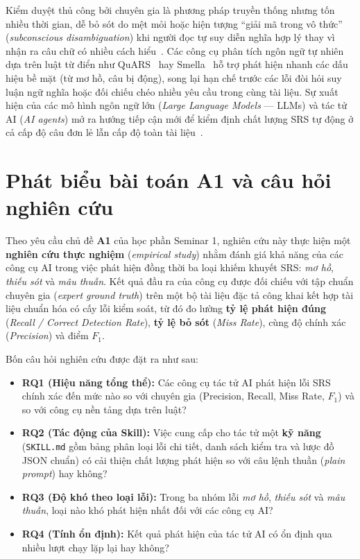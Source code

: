 \documentclass[12pt,a4paper]{report}
\begin{document}
Kiểm duyệt thủ công bởi chuyên gia là phương pháp truyền thống nhưng tốn nhiều thời gian, dễ bỏ sót do mệt mỏi hoặc hiện tượng ``giải mã trong vô thức'' (\textit{subconscious disambiguation}) khi người đọc tự suy diễn nghĩa hợp lý thay vì nhận ra câu chữ có nhiều cách hiểu~\cite{berry2003}. Các công cụ phân tích ngôn ngữ tự nhiên dựa trên luật từ điển như QuARS~\cite{fabbrini2005} hay Smella~\cite{femmer2017} hỗ trợ phát hiện nhanh các dấu hiệu bề mặt (từ mơ hồ, câu bị động), song lại hạn chế trước các lỗi đòi hỏi suy luận ngữ nghĩa hoặc đối chiếu chéo nhiều yêu cầu trong cùng tài liệu. Sự xuất hiện của các mô hình ngôn ngữ lớn (\textit{Large Language Models} --- LLMs) và tác tử AI (\textit{AI agents}) mở ra hướng tiếp cận mới để kiểm định chất lượng SRS tự động ở cả cấp độ câu đơn lẻ lẫn cấp độ toàn tài liệu~\cite{lubos2024,ronanki2025}.

\section{Phát biểu bài toán A1 và câu hỏi nghiên cứu}
Theo yêu cầu chủ đề \textbf{A1} của học phần Seminar 1, nghiên cứu này thực hiện một \textbf{nghiên cứu thực nghiệm} (\textit{empirical study}) nhằm đánh giá khả năng của các công cụ AI trong việc phát hiện đồng thời ba loại khiếm khuyết SRS: \textit{mơ hồ}, \textit{thiếu sót} và \textit{mâu thuẫn}. Kết quả đầu ra của công cụ được đối chiếu với tập chuẩn chuyên gia (\textit{expert ground truth}) trên một bộ tài liệu đặc tả công khai kết hợp tài liệu chuẩn hóa có cấy lỗi kiểm soát, từ đó đo lường \textbf{tỷ lệ phát hiện đúng} (\textit{Recall / Correct Detection Rate}), \textbf{tỷ lệ bỏ sót} (\textit{Miss Rate}), cùng độ chính xác (\textit{Precision}) và điểm $F_1$.

Bốn câu hỏi nghiên cứu được đặt ra như sau:
\begin{itemize}
  \item \textbf{RQ1 (Hiệu năng tổng thể):} Các công cụ tác tử AI phát hiện lỗi SRS chính xác đến mức nào so với chuyên gia (Precision, Recall, Miss Rate, $F_1$) và so với công cụ nền tảng dựa trên luật?
  \item \textbf{RQ2 (Tác động của Skill):} Việc cung cấp cho tác tử một \textbf{kỹ năng} (\texttt{SKILL.md} gồm bảng phân loại lỗi chi tiết, danh sách kiểm tra và lược đồ JSON chuẩn) có cải thiện chất lượng phát hiện so với câu lệnh thuần (\textit{plain prompt}) hay không?
  \item \textbf{RQ3 (Độ khó theo loại lỗi):} Trong ba nhóm lỗi \textit{mơ hồ}, \textit{thiếu sót} và \textit{mâu thuẫn}, loại nào khó phát hiện nhất đối với các công cụ AI?
  \item \textbf{RQ4 (Tính ổn định):} Kết quả phát hiện của tác tử AI có ổn định qua nhiều lượt chạy lặp lại hay không?
\end{itemize}
\end{document}

